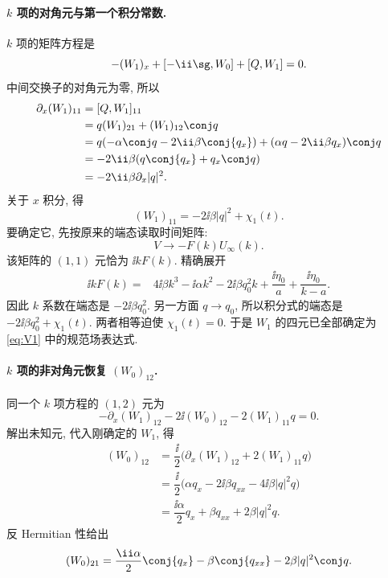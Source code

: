\paragraph{$k$ 项的对角元与第一个积分常数.}
$k$ 项的矩阵方程是
\[
-(W_1)_x+[-\ii\sg,W_0]+[Q,W_1]=0.
\]
中间交换子的对角元为零, 所以
\[
\begin{aligned}
\partial_x(W_1)_{11}
&=[Q,W_1]_{11}\\
&=q(W_1)_{21}+(W_1)_{12}\conj q\\
&=q(-\alpha\conj q-2\ii\beta\conj{q_x})
+(\alpha q-2\ii\beta q_x)\conj q\\
&=-2\ii\beta(q\conj{q_x}+q_x\conj q)\\
&=-2\ii\beta\partial_x|q|^2.
\end{aligned}
\]
关于 $x$ 积分, 得
\[
(W_1)_{11}=-2\ii\beta|q|^2+\chi_1(t).
\]
要确定它, 先按原来的端态读取时间矩阵:
\[
 V\longrightarrow-F(k)U_\infty(k).
\]
该矩阵的 $(1,1)$ 元恰为 $\ii kF(k)$.
精确展开
\[
\begin{aligned}
\ii kF(k)
={}&4\ii\beta k^3-\ii\alpha k^2
-2\ii\beta q_0^2 k
+\dfrac{\ii\eta_0}{a}
+\dfrac{\ii\eta_0}{k-a}.
\end{aligned}
\]
因此 $k$ 系数在端态是 $-2\ii\beta q_0^2$.
另一方面 $q\to q_0$, 所以积分式的端态是
$-2\ii\beta q_0^2+\chi_1(t)$.
两者相等迫使 $\chi_1(t)=0$.
于是 $W_1$ 的四元已全部确定为 \eqref{eq:V1} 中的规范场表达式.

\paragraph{$k$ 项的非对角元恢复 $(W_0)_{12}$.}
同一个 $k$ 项方程的 $(1,2)$ 元为
\[
-\partial_x(W_1)_{12}-2\ii(W_0)_{12}
-2(W_1)_{11}q=0.
\]
解出未知元, 代入刚确定的 $W_1$, 得
\[
\begin{aligned}
(W_0)_{12}
&=\dfrac{\ii}{2}
\bigl(\partial_x(W_1)_{12}+2(W_1)_{11}q\bigr)\\
&=\dfrac{\ii}{2}
\bigl(\alpha q_x-2\ii\beta q_{xx}
-4\ii\beta|q|^2q\bigr)\\
&=\dfrac{\ii\alpha}{2}q_x+\beta q_{xx}+2\beta|q|^2q.
\end{aligned}
\]
反 Hermitian 性给出
\[
(W_0)_{21}
=\dfrac{\ii\alpha}{2}\conj{q_x}
-\beta\conj{q_{xx}}-2\beta|q|^2\conj q.
\]

